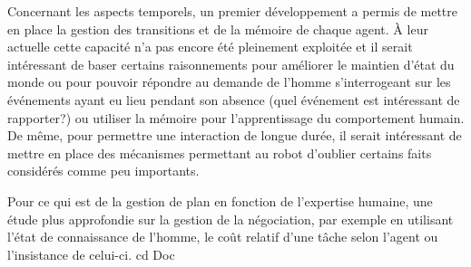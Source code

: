 \documentclass[a4paper,11pt,twoside]{StyleThese}
\begin{document}
Concernant les aspects temporels, un premier développement a permis de mettre en place la gestion des transitions et de la mémoire de chaque agent. À leur actuelle cette capacité n'a pas encore été pleinement exploitée et il serait intéressant de baser certains raisonnements pour améliorer le maintien d'état du monde ou pour pouvoir répondre au demande de l'homme s'interrogeant sur les événements ayant eu lieu pendant son absence (quel événement est intéressant de rapporter?) ou utiliser la mémoire pour l'apprentissage du comportement humain. De même, pour permettre une interaction de longue durée, il serait intéressant de mettre en place des mécanismes permettant au robot d'oublier certains faits considérés comme peu importants.

Pour ce qui est de la gestion de plan en fonction de l'expertise humaine, une étude plus approfondie sur la gestion de la négociation, par exemple en utilisant l'état de connaissance de l'homme, le coût relatif d'une tâche selon l'agent ou l'insistance de celui-ci.
cd Doc
 

\ifdefined{}
\else


\end{document}
